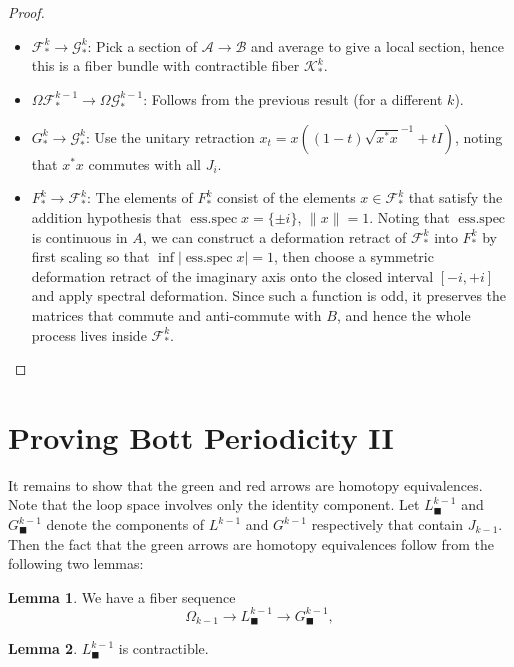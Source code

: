 \documentclass{shortart}
\theoremstyle{definition}
\newtheorem*{lemma}{Lemma}
\DeclareMathOperator{\essspec}{ess.spec}
\begin{document}
\begin{proof}\leavevmode
  \begin{itemize}
    \item $\mathcal{F}^k_* \to \mathcal{G}_*^k$: Pick a section of $\mathcal{A} \to \mathcal{B}$ and average to give a local section, hence this is a fiber bundle with contractible fiber $\mathcal{K}^k_*$.
    \item $\Omega \mathcal{F}_*^{k - 1} \to \Omega \mathcal{G}_*^{k - 1}$: Follows from the previous result (for a different $k$).
    \item $G_*^k \to \mathcal{G}^k_*$: Use the unitary retraction $x_t = x ((1 - t)\sqrt{x^* x}^{-1} + tI)$, noting that $x^* x$ commutes with all $J_i$.
    \item $F_*^k \to \mathcal{F}_*^k$: The elements of $F_*^k$ consist of the elements $x \in \mathcal{F}_*^k$ that satisfy the addition hypothesis that $\essspec x = \{\pm i\}$, $\|x\| = 1$. Noting that $\essspec$ is continuous in $A$, we can construct a deformation retract of $\mathcal{F}_*^k$ into $F_*^k$ by first scaling so that $\inf |\essspec x| = 1$, then choose a symmetric deformation retract of the imaginary axis onto the closed interval $[-i, +i]$ and apply spectral deformation. Since such a function is odd, it preserves the matrices that commute and anti-commute with $B$, and hence the whole process lives inside $\mathcal{F}_*^k$.\qedhere
  \end{itemize}
\end{proof}

\section{Proving Bott Periodicity II}
It remains to show that the green and red arrows are homotopy equivalences. Note that the loop space involves only the identity component. Let $L_\blacksquare^{k - 1}$ and $G_\blacksquare^{k - 1}$ denote the components of $L^{k - 1}$ and $G^{k - 1}$ respectively that contain $J_{k - 1}$. Then the fact that the green arrows are homotopy equivalences follow from the following two lemmas:

\begin{lemma}
  We have a fiber sequence
  \[
    \Omega_{k - 1} \to L_\blacksquare^{k - 1} \to G_\blacksquare^{k - 1},
  \]
\end{lemma}

\begin{lemma}
  $L_\blacksquare^{k - 1}$ is contractible.
\end{lemma}
\end{document}
